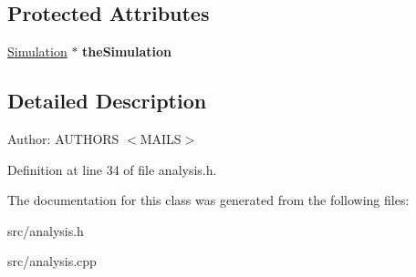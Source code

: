 \subsection*{Protected Attributes}
\begin{CompactItemize}
\item 
\hypertarget{classmknix_1_1Analysis_1abc29e3b8565590b6bf0ce2d8b3b68f}{
\hyperlink{classmknix_1_1Simulation}{Simulation} $\ast$ \textbf{theSimulation}}
\label{classmknix_1_1Analysis_1abc29e3b8565590b6bf0ce2d8b3b68f}

\end{CompactItemize}


\subsection{Detailed Description}
\begin{Desc}
\item[Author:]AUTHORS $<$MAILS$>$ \end{Desc}


Definition at line 34 of file analysis.h.

The documentation for this class was generated from the following files:\begin{CompactItemize}
\item 
src/analysis.h\item 
src/analysis.cpp\end{CompactItemize}
